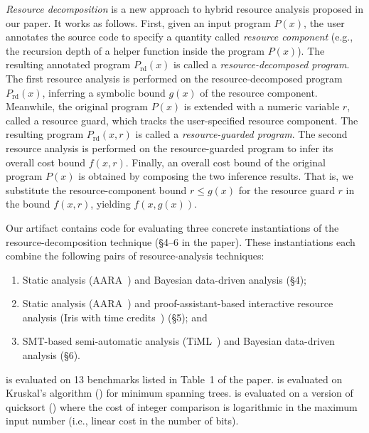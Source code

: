 \emph{Resource decomposition} is a new approach to hybrid resource analysis
proposed in our paper.
%
It works as follows.
%
First, given an input program $P(x)$, the user annotates the source code to
specify a quantity called \emph{resource component} (e.g., the recursion depth
of a helper function inside the program $P(x)$).
%
The resulting annotated program $P_{\mathrm{rd}}(x)$ is called a
\emph{resource-decomposed program}.
%
The first resource analysis is performed on the resource-decomposed program
$P_{\mathrm{rd}}(x)$, inferring a symbolic bound $g(x)$ of the resource
component.
%
Meanwhile, the original program $P(x)$ is extended with a numeric variable $r$,
called a resource guard, which tracks the user-specified resource component.
%
The resulting program $P_{\mathrm{rd}}(x, r)$ is called a \emph{resource-guarded
  program}.
%
The second resource analysis is performed on the resource-guarded program to
infer its overall cost bound $f(x, r)$.
%
Finally, an overall cost bound of the original program $P(x)$ is obtained by
composing the two inference results.
%
That is, we substitute the resource-component bound $r \leq g(x)$ for the
resource guard $r$ in the bound $f(x, r)$, yielding $f(x, g(x))$.

Our artifact contains code for evaluating three concrete instantiations of the
resource-decomposition technique (\S4--6 in the paper).
%
These instantiations each combine the following pairs of resource-analysis
techniques:
\begin{enumerate}[label={Inst. \arabic*}]
  \item Static analysis (AARA~\citep{Hofmann2003,Hoffmann2011a,Hoffmann2022})
        and Bayesian data-driven analysis (\S4);
        \label{introduction:instantiation:1}
  \item Static analysis (AARA~\citep{Hofmann2003,Hoffmann2011a,Hoffmann2022})
        and proof-assistant-based interactive resource analysis (Iris with time
        credits~\citep{Chargueraud2019}) (\S5); and
        \label{introduction:instantiation:2}
  \item SMT-based semi-automatic analysis (TiML~\citep{WangWC17}) and Bayesian
        data-driven analysis (\S6).
        \label{introduction:instantiation:3}
\end{enumerate}
%
 is evaluated on 13 benchmarks listed in
Table~1 of the paper.
%
 is evaluated on Kruskal's algorithm
(\kruskal{}) for minimum spanning trees.
%
 is evaluated on a version of quicksort
(\quicksorttiml{}) where the cost of integer comparison is logarithmic in the
maximum input number (i.e., linear cost in the number of bits).

